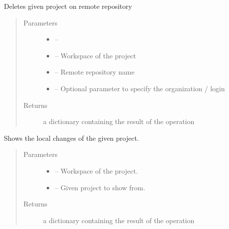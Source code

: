 \documentclass[letterpaper,10pt,english]{sphinxmanual}
\begin{document}
\begin{fulllineitems}
\label{_source/son_editor.impl:son_editor.impl.gitimpl.delete}
Deletes given project on remote repository
\begin{quote}\begin{description}
\item[{Parameters}] \leavevmode\begin{itemize}
\item {} 
 -- 

\item {} 
 -- Workspace of the project

\item {} 
 -- Remote repository name

\item {} 
 -- Optional parameter to specify the organization / login

\end{itemize}

\item[{Returns}] \leavevmode
a dictionary containing the result of the operation

\end{description}\end{quote}

\end{fulllineitems}


\begin{fulllineitems}
\label{_source/son_editor.impl:son_editor.impl.gitimpl.diff}
Shows the local changes of the given project.
\begin{quote}\begin{description}
\item[{Parameters}] \leavevmode\begin{itemize}
\item {} 
 -- Workspace of the project.

\item {} 
 -- Given project to show from.

\end{itemize}

\item[{Returns}] \leavevmode
a dictionary containing the result of the operation

\end{description}\end{quote}

\end{fulllineitems}
\end{document}
